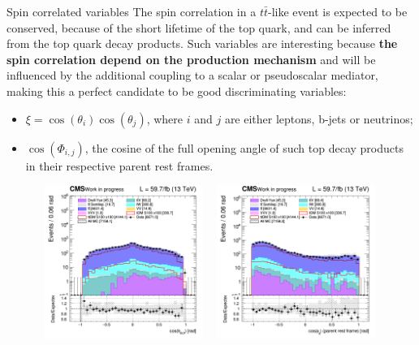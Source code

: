 \documentclass[8pt]{beamer}
\begin{document}
\begin{frame}{Spin correlated variables}
\justifying
The spin correlation in a $t \bar t$-like event is expected to be conserved, because of the short lifetime of the top quark, and can be inferred from the top quark decay products. \vfill
Such variables are interesting because \textbf{the spin correlation depend on the production mechanism} and will be influenced by
the additional coupling to a scalar or pseudoscalar mediator, making this a perfect candidate to be good discriminating variables:
\begin{itemize}
\justifying
\item $\xi = \cos(\theta_i) \cos(\theta_j)$, where $i$ and $j$ are either leptons, b-jets or neutrinos;
\item $\cos(\Phi_{i,j})$, the cosine of the full opening angle of such top decay products in their respective parent rest frames.
\end{itemize} \vfill

\begin{figure}[htbp]
\centering
\begin{minipage}[b]{.49\textwidth}
\includegraphics[width=5.5cm, height=5cm]{figs/2018/SmearSR-ttDM-scalar100/log_cratio_topCR_ll_costhetall.png}
\end{minipage}\hfill
\begin{minipage}[b]{.49\textwidth}
\includegraphics[width=5.5cm, height=5cm]{figs/2018/SmearSR-ttDM-scalar100/log_cratio_topCR_ll_cosphill.png}
\end{minipage} \hfill
\label{fig:SRdiscmblt}
\end{figure}
\end{frame}
\end{document}
